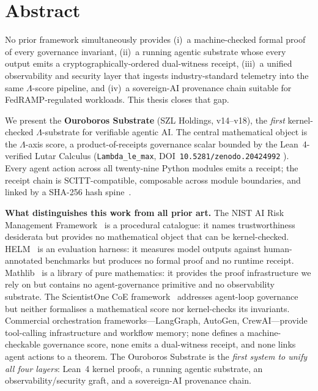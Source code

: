 

\chapter*{Abstract}

No prior framework simultaneously provides (i)~a machine-checked formal
proof of every governance invariant, (ii)~a running agentic substrate
whose every output emits a cryptographically-ordered dual-witness receipt,
(iii)~a unified observability and security layer that ingests
industry-standard telemetry into the same \(\Lambda\)-score pipeline,
and (iv)~a sovereign-AI provenance chain suitable for FedRAMP-regulated
workloads.
This thesis closes that gap.

\medskip

We present the \textbf{Ouroboros Substrate} (SZL Holdings, v14--v18),
the \emph{first} kernel-checked \(\Lambda\)-substrate for verifiable
agentic AI\@.
The central mathematical object is the \(\Lambda\)-axis score, a
product-of-receipts governance scalar bounded by the Lean~4-verified
Lutar Calculus (\texttt{Lambda\_le\_max}, DOI~\texttt{10.5281/zenodo.20424992}
\cite{lutar2026v14}).
Every agent action across all twenty-nine Python modules emits a receipt;
the receipt chain is SCITT-compatible, composable across module
boundaries, and linked by a SHA-256 hash spine~\cite{nist2012sha}.

\medskip

\textbf{What distinguishes this work from all prior art.}
The NIST AI Risk Management Framework~\cite{nist2023ai} is a procedural
catalogue: it names trustworthiness desiderata but provides no
mathematical object that can be kernel-checked.
HELM~\cite{liang2022helm} is an evaluation harness: it measures model
outputs against human-annotated benchmarks but produces no formal proof
and no runtime receipt.
Mathlib~\cite{mathlib2020} is a library of pure mathematics: it provides
the proof infrastructure we rely on but contains no agent-governance
primitive and no observability substrate.
The ScientistOne CoE framework~\cite{scientistoneCoE} addresses
agent-loop governance but neither formalises a mathematical score nor
kernel-checks its invariants.
Commercial orchestration frameworks---LangGraph, AutoGen, CrewAI---provide
tool-calling infrastructure and workflow memory; none defines a
machine-checkable governance score, none emits a dual-witness receipt,
and none links agent actions to a theorem.
The Ouroboros Substrate is the \emph{first system to unify all four
layers}: Lean~4 kernel proofs, a running agentic substrate, an
observability/security graft, and a sovereign-AI provenance chain.

